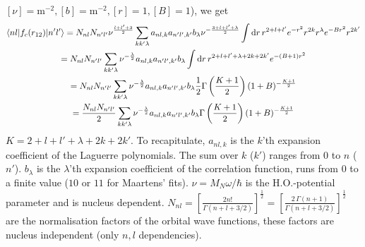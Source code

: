 \documentclass[10pt]{article}
\begin{document}
\begin{itemize}
$[\nu] = \text{m}^{-2}, [b] = \text{m}^{-2}, [r] = 1, [B] = 1$), we get
	\begin{multline}
		\braket{ n l |  f_{c}(r_{12}) | n' l'} = N_{nl} N_{n'l'} 
\nu^{\frac{l + l' + 3}{2}} \sum_{kk'\lambda} a_{nl,k} a_{n'l',k'} b_{\lambda}  
\nu^{- \frac{3 + l + l' + \lambda}{2}} \int \text{d} r \, r^{2+l+l'} e^{-r^{2}} 
r^{2k} r^{\lambda} e^{-B r^{2}} r^{2k'} \\
		= N_{nl} N_{n'l'} \sum_{kk'\lambda} \nu^{-\frac{\lambda}{2}}  
a_{nl,k} a_{n'l',k'} b_{\lambda} \int \text{d} r \, r^{2+l+l'+\lambda + 2k + 
2k'} e^{-(B+1) r^{2}} \\
		=  N_{nl} N_{n'l'}  \sum_{kk'\lambda} \nu^{-\frac{\lambda}{2}} 
a_{nl,k} a_{n'l',k'} b_{\lambda} \frac{1}{2} \Gamma \left( \frac{K+1}{2} 
\right) (1 + B)^{-\frac{K+1}{2}} \\
		= \frac{N_{nl} N_{n'l'}}{2}  \sum_{kk'\lambda} 
\nu^{-\frac{\lambda}{2}} a_{nl,k} a_{n'l',k'} b_{\lambda} \Gamma \left( 
\frac{K+1}{2} \right) (1 + B)^{-\frac{K+1}{2}}
		\label{eq:central_corr_single}
	\end{multline}
	$K = 2+l+l'+ \lambda + 2k + 2k'$. To recapitulate, $a_{nl,k}$ is the 
$k$'th expansion coefficient of the Laguerre polynomials. The sum over $k$ 
($k'$) ranges from $0$ to $n$ ($n'$). $b_{\lambda}$ is the $\lambda$'th 
expansion coefficient of the correlation function, runs from $0$ to a finite 
value ($10$ or $11$ for Maartens' fits). $\nu = M_N \omega /\hbar$ is the 
H.O.-potential parameter and is nucleus dependent. $N_{nl} = \left[ 
\frac{2n!}{\Gamma(n + l + 3/2)} \right]^{\frac{1}{2}} = \left[ \frac{ 2 \, 
\Gamma( n + 1)}{\Gamma(n + l + 3/2)} \right]^{\frac{1}{2}} $ are the 
normalisation factors of the orbital wave functions, these factors are nucleus 
independent (only $n,l$ dependencies).


\end{itemize}
\end{document}
